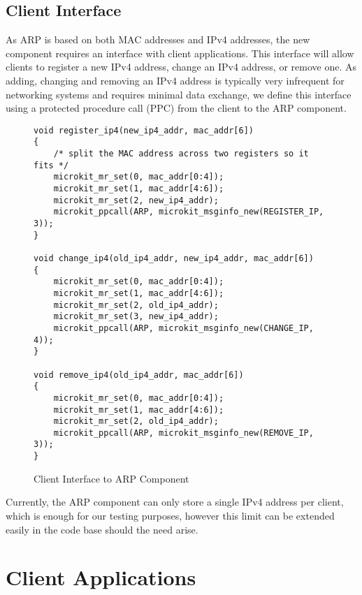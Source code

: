 \subsection{Client Interface}
As ARP is based on both MAC addresses and IPv4 addresses, the new component
requires an interface with client applications. This interface will allow clients
to register a new IPv4 address, change an IPv4 address, or remove one. As adding,
changing and removing an IPv4 address is typically very infrequent for networking systems
and requires minimal data exchange, we define this interface using a protected procedure
call (PPC) from the client to the ARP component. 

\begin{figure} [H]
    \begin{verbatim}
void register_ip4(new_ip4_addr, mac_addr[6])
{
    /* split the MAC address across two registers so it fits */
    microkit_mr_set(0, mac_addr[0:4]);
    microkit_mr_set(1, mac_addr[4:6]);
    microkit_mr_set(2, new_ip4_addr);
    microkit_ppcall(ARP, microkit_msginfo_new(REGISTER_IP, 3));
}

void change_ip4(old_ip4_addr, new_ip4_addr, mac_addr[6])
{
    microkit_mr_set(0, mac_addr[0:4]);
    microkit_mr_set(1, mac_addr[4:6]);
    microkit_mr_set(2, old_ip4_addr);
    microkit_mr_set(3, new_ip4_addr);
    microkit_ppcall(ARP, microkit_msginfo_new(CHANGE_IP, 4));
}

void remove_ip4(old_ip4_addr, mac_addr[6])
{
    microkit_mr_set(0, mac_addr[0:4]);
    microkit_mr_set(1, mac_addr[4:6]);
    microkit_mr_set(2, old_ip4_addr);
    microkit_ppcall(ARP, microkit_msginfo_new(REMOVE_IP, 3));
}
\end{verbatim}
\caption{Client Interface to ARP Component}
\label{l:arpintf}
\end{figure}

Currently, the ARP component can only store a single IPv4 address per client, which
is enough for our testing purposes, however this limit can be extended easily in the code
base should the need arise.\\

\section{Client Applications}\label{s:client_apps}


